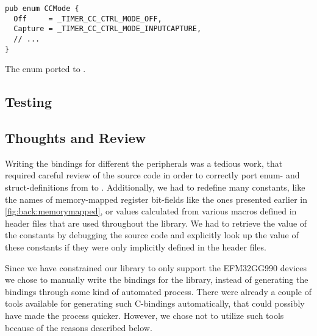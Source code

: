 \begin{listing}[h]
\begin{verbatim}
pub enum CCMode {
  Off     = _TIMER_CC_CTRL_MODE_OFF,
  Capture = _TIMER_CC_CTRL_MODE_INPUTCAPTURE,
  // ...
}
\end{verbatim}
\caption{The enum ported to {\rust}.}
\label{lst:enum_naming_rust}
\end{listing}

\subsection{Testing}
\label{ssub:testing}


\subsection{Thoughts and Review}


Writing the bindings for different the peripherals was a tedious work, that required careful review of the \emlib source code in order to correctly port enum- and struct-definitions from {\C} to {\rust}.
Additionally, we had to redefine many constants, like the names of memory-mapped register bit-fields like the ones presented earlier in \autoref{fig:back:memorymapped}, or values calculated from various {\C} macros defined in header files that are used throughout the library.
We had to retrieve the value of the constants by debugging the source code and explicitly look up the value of these constants if they were only implicitly defined in the header files.

Since we have constrained our library to only support the EFM32GG990 devices we chose to manually write the bindings for the library, instead of generating the bindings through some kind of automated process.
There were already a couple of tools available for generating such C-bindings automatically, that could possibly have made the process quicker.
However, we chose not to utilize such tools because of the reasons described below.

